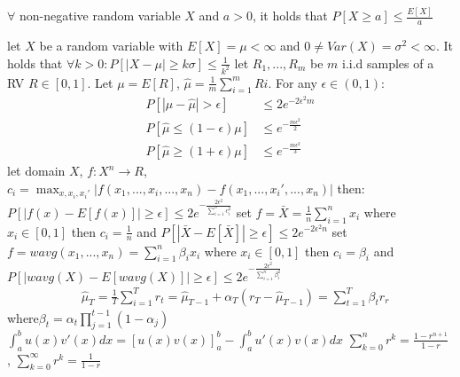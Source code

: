 
 $\forall$ non-negative random variable $X$ and $a > 0$, it holds that $P[X \geq a] \leq \frac{E[X]}{a}$

 let $X$ be a random variable with $E[X] = \mu < \infty$ and $0 \neq Var(X) = \sigma^2 < \infty$. It holds that $\forall k > 0: P[|X - \mu| \geq k\sigma] \leq \frac{1}{k^2}$
 let $R_1, ..., R_m$ be $m$ i.i.d samples of a RV $R \in [0,1]$. Let $\mu = E[R]$, $\hat{\mu}= \frac{1}{m} \sum_{i=1}^{m} Ri$. For any $\epsilon \in (0,1)$:
\begin{align*}
P[|\mu - \hat{\mu}| > \epsilon] &\leq 2e^{-2\epsilon^2m}\\
P[\hat{\mu} \leq (1 - \epsilon)\mu] &\leq e^{-\frac{m\epsilon^2}{2}}\\
P[\hat{\mu} \geq (1 + \epsilon)\mu] &\leq e^{-\frac{m\epsilon^2}{3}}
\end{align*}
 let domain $X$, $f:X^n \rightarrow R$, $c_i = \max_{x,x_i,x_i'}|f(x_1, ..., x_i, ..., x_n) - f(x_1, ..., x_i',..., x_n)|$ then: $P[|f(x) - E[f(x)]| \geq \epsilon] \leq 2e^{-\frac{2\epsilon^2}{\sum_{i=1}^{n} c_i^2}}$
 set $f = \bar{X} = \frac{1}{n} \sum_{i=1}^{n} x_i$ where $x_i \in [0,1]$ then $c_i = \frac{1}{n}$ and $P[|\bar{X} - E[\bar{X}]| \geq \epsilon] \leq 2e^{-2\epsilon^2n}$
 set $f = wavg(x_1, ..., x_n) = \sum_{i=1}^{n} \beta_i x_i$ where $x_i \in [0,1]$ then $c_i = \beta_i$ and $P[|wavg(X) - E[wavg(X)]| \geq \epsilon] \leq 2e^{-\frac{2\epsilon^2}{\sum_{i=1}^{n} \beta_i^2}}$
\begin{align*}
&\hat{\mu}_T = \frac{1}{T} \sum_{i=1}^{T} r_t = \hat{\mu}_{T-1} + \alpha_T (r_T - \hat{\mu}_{T-1}) = \sum_{t=1}^{T} \beta_t r_r 
\end{align*} where$ \beta_t = \alpha_t \prod_{j=1}^{t-1} (1 - \alpha_j)$
 $\int_{a}^{b} u(x)v'(x)dx = [u(x)v(x)]_a^b - \int_{a}^{b} u'(x)v(x)dx$
 $\sum_{k=0}^{n} r^k = \frac{1-r^{n+1}}{1-r}$ , $\sum_{k=0}^{\infty} r^k = \frac{1}{1-r}$
